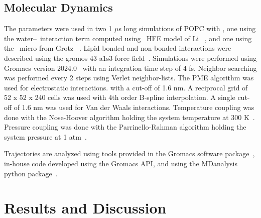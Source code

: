 \subsection{Molecular Dynamics}
The  parameters were used in
two 1 $\mu$s long simulations of POPC with \mgcl{}, one using the water--\mg~interaction term computed using \mg~HFE model of Li \etal~\cite{merzhfe}, and
one using the \mg~micro from Grotz \etal~\cite{grotz:2021:optimized,micro}.
Lipid bonded and non-bonded interactions were described using the gromos 43-a1s3 force-field~\cite{chiu:2009}.
Simulations were performed using Gromacs version
2024.0~\cite{gromacs}
with an integration time step of 4 fs.
Neighbor searching was performed every 2 steps using Verlet neighbor-lists.
The PME algorithm was used for electrostatic interactions.
with a cut-off of 1.6 nm.
A reciprocal grid of 52 x 52 x 240 cells was used with 4th order B-spline interpolation.
A single cut-off of 1.6 nm was used for Van der Waals interactions.
Temperature coupling was done with the Nose-Hoover algorithm holding the system temperature at 300 K~\cite{nose:1983}.
Pressure coupling was done with the Parrinello-Rahman algorithm holding the system pressure at 1 atm~\cite{parrinello:1981}.

Trajectories are analyzed using tools provided in the Gromacs software package~\cite{gromacs}, in-house code developed using the Gromacs API, and using the MDanalysis python package~\cite{mdanalysis1,mdanalysis2}.

\section{Results and Discussion}

